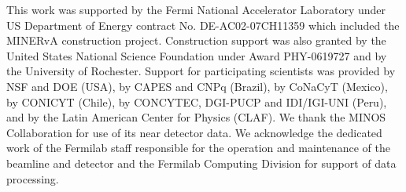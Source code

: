 This work was supported by the Fermi National Accelerator Laboratory under US Department of Energy contract No. DE-AC02-07CH11359 which included the MINERvA construction project. Construction support was also granted by the United States National Science Foundation under Award PHY-0619727 and by the University of Rochester. Support for participating scientists was provided by NSF and DOE (USA), by CAPES and CNPq (Brazil), by CoNaCyT (Mexico), by CONICYT (Chile), by CONCYTEC, DGI-PUCP and IDI/IGI-UNI (Peru), and by the Latin American Center for Physics (CLAF). We thank the MINOS Collaboration for use of its near detector data. We acknowledge the dedicated work of the Fermilab staff responsible for the operation and maintenance of the beamline and detector and the Fermilab Computing Division for support of data processing.
